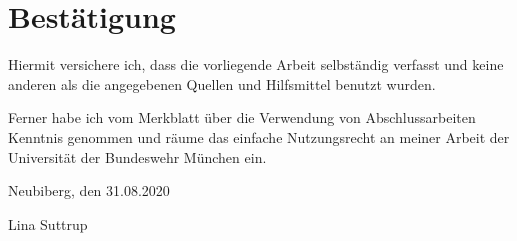 \chapter*{Best\"atigung}

Hiermit versichere ich, dass die vorliegende Arbeit selbst\"andig verfasst und keine anderen als die angegebenen Quellen und Hilfsmittel benutzt wurden.

Ferner habe ich vom Merkblatt \"uber die Verwendung von Abschlussarbeiten Kenntnis genommen und r\"aume das einfache Nutzungsrecht an meiner Arbeit der Universit\"at der Bundeswehr M\"unchen ein.

\vspace{1cm}

Neubiberg, den 31.08.2020

\vspace{2cm} 

Lina Suttrup

